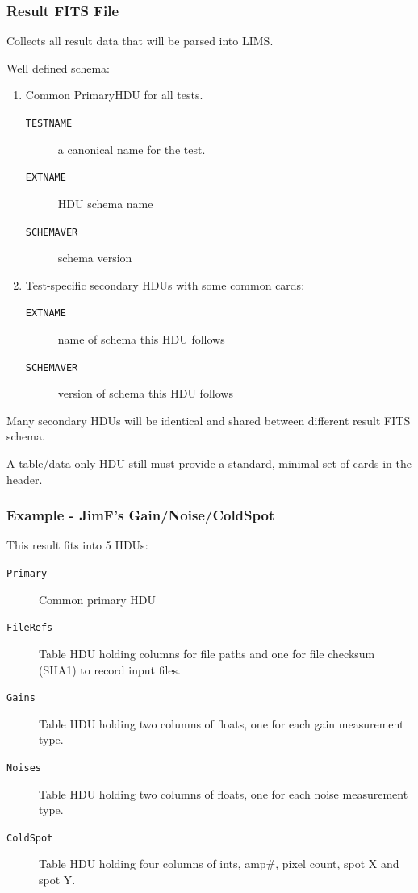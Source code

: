 \documentclass[xcolor=dvipsnames]{beamer}
\begin{document}
\begin{frame}
  \frametitle{Result FITS File}
  Collects all result data that will be parsed into LIMS.

  Well defined schema:
  \begin{enumerate}
  \item Common PrimaryHDU for all tests.
    \begin{description}
    \item[\texttt{TESTNAME}] a canonical name for the test.
    \item[\texttt{EXTNAME}] HDU schema name
    \item[\texttt{SCHEMAVER}] schema version
    \end{description}
  \item Test-specific secondary HDUs with some common cards:
    \begin{description}
    \item[\texttt{EXTNAME}] name of schema this HDU follows
    \item[\texttt{SCHEMAVER}] version of schema this HDU follows
    \end{description}
  \end{enumerate}

  Many secondary HDUs will be identical and shared between different
  result FITS schema.

  A table/data-only HDU still must provide a standard, minimal set of
  cards in the header.
\end{frame}

\begin{frame}
  \frametitle{Example - JimF's Gain/Noise/ColdSpot}
  This result fits into 5 HDUs:
  \begin{description}
  \item[\texttt{Primary}] Common primary HDU
  \item[\texttt{FileRefs}] Table HDU holding columns for file paths and
    one for file checksum (SHA1) to record input files.
  \item[\texttt{Gains}] Table HDU holding two columns of floats, one
    for each gain measurement type.
  \item[\texttt{Noises}] Table HDU holding two columns of floats, one
    for each noise measurement type.
  \item[\texttt{ColdSpot}] Table HDU holding four columns of ints,
    amp\#, pixel count, spot X and spot Y.
  \end{description}

\end{frame}
\end{document}
